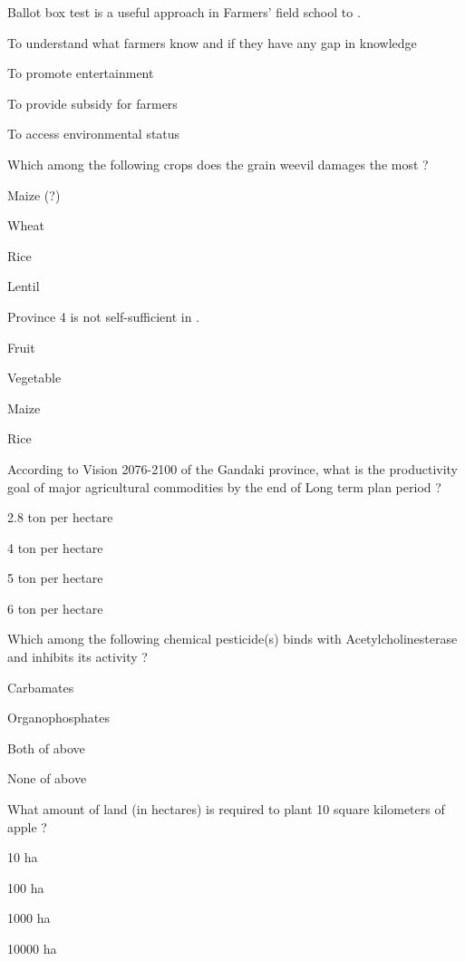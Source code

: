 \begin{questions}
\question Ballot box test is a useful approach in Farmers' field school to \fillin[][3cm].\begin{items}
\item* To understand what farmers know and if they have any gap in knowledge
\item To promote entertainment
\item To provide subsidy for farmers
\item To access environmental status
\end{items}

\question Which among the following crops does the grain weevil damages the most ?
\begin{items}
\item* Maize (?)
\item Wheat
\item Rice
\item Lentil
\end{items}

\question Province 4 is not self-sufficient in \fillin[][3cm].
\begin{items}
\item Fruit
\item Vegetable
\item Maize
\item* Rice
\end{items}

\question According to Vision 2076-2100 of the Gandaki province, what is the productivity goal of major agricultural commodities by the end of Long term plan period ?
\begin{items}
\item 2.8 ton per hectare
\item 4 ton per hectare
\item 5 ton per hectare
\item* 6 ton per hectare
\end{items}

\question Which among the following chemical pesticide(s) binds with Acetylcholinesterase and inhibits its activity ?
\begin{items}
\item Carbamates
\item Organophosphates
\item* Both of above
\item None of above
\end{items}

\question What amount of land (in hectares) is required to plant 10 square kilometers of apple ?
\begin{items}
\item 10 ha
\item 100 ha
\item* 1000 ha
\item 10000 ha
\end{items}


\end{questions}
